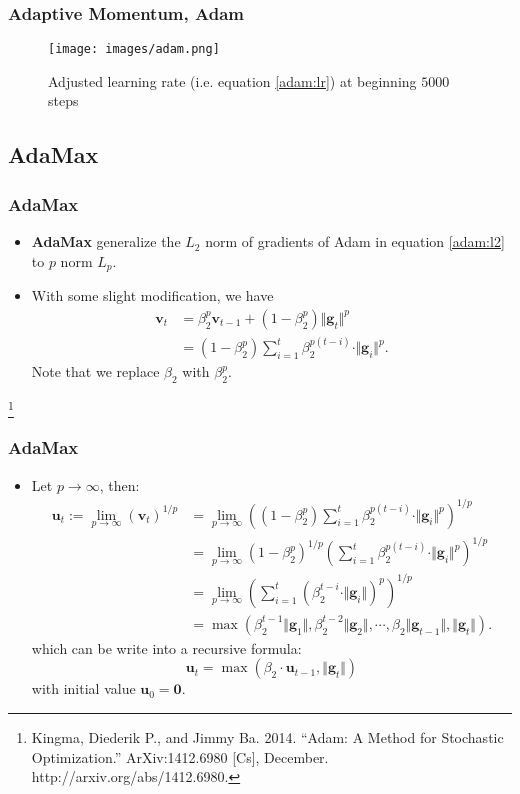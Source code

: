 \documentclass[10pt]{beamer}
\theoremstyle{mystyle}
\def\bb#1{\mathbf{#1}}
\newcommand\blfootnote[1]{%
  \begingroup
  \renewcommand\thefootnote{}\footnote[frame]{#1}%
  \addtocounter{footnote}{-1}%
  \endgroup
}
\theoremstyle{mystyle}
\begin{document}
\begin{frame}
	\frametitle{Adaptive Momentum, Adam}
	\begin{figure}[h]
		\centering
		\texttt{[image: images/adam.png]}
		\caption{Adjusted learning rate (i.e. equation \eqref{adam:lr}) at beginning $5000$ steps}
	\end{figure}
\end{frame}

\subsection{AdaMax}
\begin{frame}
	\frametitle{AdaMax}
	\begin{itemize}
		\item {\bf AdaMax} generalize the $L_2$ norm of gradients of Adam in equation \eqref{adam:l2} to $p$ norm $L_p$.
		\item With some slight modification, we have
		\begin{align}\nonumber
			\bb v_t &= \beta_2^p\bb v_{t-1} + (1-\beta_2^p)\Vert\bb g_t\Vert^p \\
			&= (1-\beta_2^p)\sum_{i=1}^t\beta_2^{p(t-i)}\cdot\Vert\bb g_i\Vert^p.
		\end{align}
		Note that we replace $\beta_2$ with $\beta_2^p$.
	\end{itemize}

	\blfootnote{Kingma, Diederik P., and Jimmy Ba. 2014. “Adam: A Method for Stochastic Optimization.” ArXiv:1412.6980 [Cs], December. http://arxiv.org/abs/1412.6980.}
\end{frame}

\begin{frame}
	\frametitle{AdaMax}
	\begin{itemize}
		\item Let $p\rightarrow\infty$, then:
		\begin{align}\nonumber
			\bb u_t := \lim_{p\rightarrow\infty}(\bb v_t)^{1/p} &= \lim_{p\rightarrow\infty}\left((1-\beta_2^p)\sum_{i=1}^t\beta_2^{p(t-i)}\cdot\Vert\bb g_i\Vert^p\right)^{1/p} \\ \nonumber
			&= \lim_{p\rightarrow\infty}(1-\beta_2^p)^{1/p}\left(\sum_{i=1}^t\beta_2^{p(t-i)}\cdot\Vert\bb g_i\Vert^p\right)^{1/p} \\ \nonumber
			&= \lim_{p\rightarrow\infty}\left(\sum_{i=1}^t\left(\beta_2^{t-i}\cdot\Vert\bb g_i\Vert\right)^p\right)^{1/p} \\
			&= \max(\beta_2^{t-1}\Vert\bb g_1\Vert, \beta_2^{t-2}\Vert\bb g_2\Vert, \cdots, \beta_2\Vert\bb g_{t-1}\Vert, \Vert\bb g_t\Vert).
		\end{align}
		which can be write into a recursive formula:
		\begin{equation}
			\bb u_t = \max(\beta_2\cdot\bb u_{t-1}, \Vert\bb g_t\Vert)
		\end{equation}
		with initial value $\bb u_0 = \bb0$.
	\end{itemize}
\end{frame}
\end{document}
